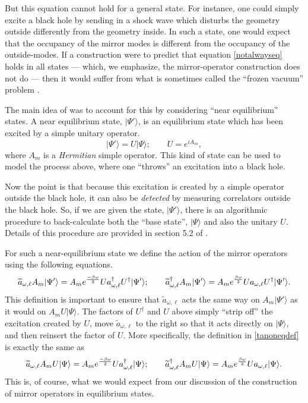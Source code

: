 \documentclass[12pt]{article}
\newcommand{\cop}[1]{#1}
\newcommand{\al}{\cop{A}} %
\def\ta{\widetilde{\cop{a}}}
\newcommand{\be}{\begin{equation}}
\newcommand{\ee}{\end{equation}}
\begin{document}
But this equation cannot hold for a general state. For instance, one could simply excite a black hole by sending in a shock wave which disturbs the geometry outside differently from the geometry inside. In such a state, one would expect that the occupancy of the mirror modes is different from the occupancy of the outside-modes. If a construction were to predict that equation \eqref{notalwayseq} holds in all states --- which, we emphasize, the mirror-operator construction does not do --- then it would suffer from what is sometimes called the ``frozen vacuum'' problem \cite{Bousso:2013ifa}.

The main idea of \cite{Papadodimas:2013jku} was to account for this by considering ``near equilibrium'' states. A near equilibrium state, $|\Psi' \rangle$,  is an equilibrium state which has been excited by a simple unitary operator.
\be
|\Psi' \rangle = U |\Psi \rangle; \qquad U = e^{i \al_m},
\ee
where $\al_m$ is a {\em Hermitian} simple operator.   This kind of state can be used to model the process above, where one ``throws'' an excitation into a black hole.

Now the point is that because this excitation is created by a simple operator outside the black hole, it can also be {\em detected} by measuring correlators outside the black hole. So, if we are given the state, $|\Psi' \rangle$, there is an algorithmic procedure to back-calculate both the ``base state'', $|\Psi \rangle$ and also the unitary $U$. Details of this procedure are provided in section 5.2 of \cite{Papadodimas:2013jku}.

For such a near-equilibrium state we  define the action of the mirror operators using the following equations.
\be
\label{tanoneqdef}
\ta_{\omega, \ell} \al_m |\Psi' \rangle = \al_m  e^{-\beta \omega \over 2} U  a_{\omega, \ell}^{\dagger}  U^{\dagger} |\Psi' \rangle; \qquad \ta_{\omega, \ell}^{\dagger} \al_m |\Psi' \rangle = \al_m  e^{\beta \omega \over 2} U  a_{\omega, \ell}  U^{\dagger} |\Psi' \rangle.
\ee
This definition is important to ensure that $\ta_{\omega, \ell}$ acts the same way on $\al_m |\Psi' \rangle$ as it would on $\al_m U |\Psi \rangle$. The factors of $U^{\dagger}$ and $U$ above simply  ``strip off'' the excitation created by $U$, move $\ta_{\omega, \ell}$ to the right so that it acts directly on $|\Psi \rangle$, and then reinsert the factor of $U$. More specifically, the definition in \eqref{tanoneqdef} is exactly the same as
\be
\ta_{\omega, \ell} \al_m U |\Psi \rangle = \al_m  e^{-\beta \omega \over 2} U  a_{\omega, \ell}^{\dagger}  |\Psi \rangle; \qquad \ta_{\omega, \ell}^{\dagger} \al_m U |\Psi \rangle = \al_m  e^{\beta \omega \over 2} U  a_{\omega, \ell} |\Psi\rangle.
\ee
This is, of course, what we would expect from our discussion of the construction of mirror operators in equilibrium states.
\end{document}
